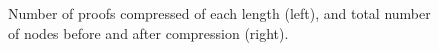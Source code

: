 \begin{figure}
\caption{Number of proofs compressed of each length (left), and total number of nodes before and after compression (right).}
\label{fig:ex2}
\end{figure}






